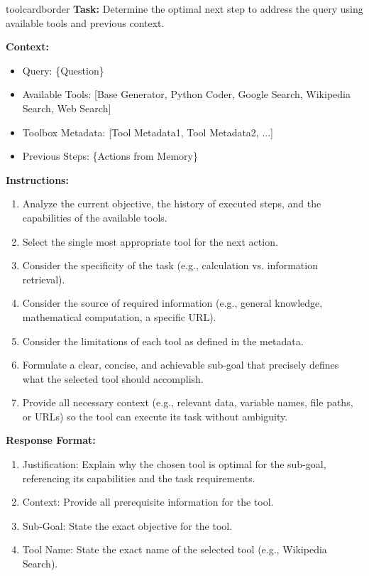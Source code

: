 \begin{custombox}[title=Instruction for {Action Planner}]{toolcardborder}
\setlength{\parindent}{0pt}
\textbf{Task:} Determine the optimal next step to address the query using available tools and previous context.

\vspace{6pt}
\noindent\textbf{Context:}
\begin{itemize}[left=0pt, label={}, itemsep=0pt, parsep=0pt]
    \item {Query:} {\{{Question}\}}
    \item {Available Tools:} [{Base Generator, Python Coder, Google Search, Wikipedia Search, Web Search}]
    \item {Toolbox Metadata:} [{Tool Metadata1, Tool Metadata2, ...}]
    \item {Previous Steps:} {\{{Actions} {from Memory}\}}
\end{itemize}

\vspace{6pt}
\noindent\textbf{Instructions:}
\begin{enumerate}[left=0pt, itemsep=0pt, parsep=0pt]
    \item Analyze the current objective, the history of executed steps, and the capabilities of the available tools.
    \item Select the {single most appropriate tool} for the next action. 
    \item Consider the {specificity} of the task (e.g., calculation vs. information retrieval).
    \item Consider the {source} of required information (e.g., general knowledge, mathematical computation, a specific URL).
    \item Consider the {limitations} of each tool as defined in the metadata.
    \item Formulate a clear, concise, and achievable {sub-goal} that precisely defines what the selected tool should accomplish.
    \item Provide all necessary {context} (e.g., relevant data, variable names, file paths, or URLs) so the tool can execute its task without ambiguity.
\end{enumerate}

\vspace{6pt}

\noindent\textbf{Response Format:}
\begin{enumerate}[left=0pt, itemsep=0pt, parsep=0pt]
    \item {Justification:} Explain why the chosen tool is optimal for the sub-goal, referencing its capabilities and the task requirements.
    \item {Context:} Provide all prerequisite information for the tool.
    \item {Sub-Goal:} State the exact objective for the tool.
    \item {Tool Name:} State the exact name of the selected tool (e.g., {Wikipedia Search}).
\end{enumerate}


\end{custombox}
